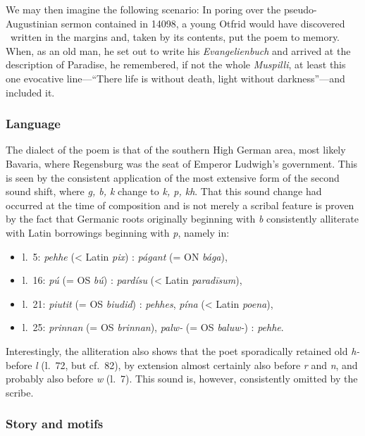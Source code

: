 We may then imagine the following scenario: In poring over the pseudo-Augustinian sermon contained in 14098, a young Otfrid would have discovered \Muspilli\ written in the margins and, taken by its contents, put the poem to memory.  When, as an old man, he set out to write his \emph{Evangelienbuch} and arrived at the description of Paradise, he remembered, if not the whole \emph{Muspilli}, at least this one evocative line---“There life is without death, light without darkness”---and included it.

\subsubsection{Language}

The dialect of the poem is that of the southern High German area, most likely Bavaria, where  Regensburg was the seat of Emperor Ludwigh’s government.  This is seen by the consistent application of the most extensive form of the second sound shift, where \emph{g, b, k} change to \emph{k, p, kh}.  That this sound change had occurred at the time of composition and is not merely a scribal feature is proven by the fact that Germanic roots originally beginning with \emph{b} consistently alliterate with Latin borrowings beginning with \emph{p}, namely in:

\begin{itemize}
  \item l.~5: \emph{pehhe} (< Latin \emph{pix}) : \emph{págant} (= ON \emph{bága}),
  \item l.~16: \emph{pú} (= OS \emph{bú}) : \emph{pardísu} (< Latin \emph{paradīsum}),
  \item l.~21: \emph{piutit} (= OS \emph{biudid}) : \emph{pehhes}, \emph{pína} (< Latin \emph{poena}),
  \item l.~25: \emph{prinnan} (= OS \emph{brinnan}), \emph{palw-} (= OS \emph{baluw-}) : \emph{pehhe}.
\end{itemize}

Interestingly, the alliteration also shows that the poet sporadically retained old \emph{h-} before \emph{l} (l.~72, but cf.~82), by extension almost certainly also before \emph{r} and \emph{n}, and probably also before \emph{w} (l.~7).  This sound is, however, consistently omitted by the scribe.

\subsubsection{Story and motifs}

